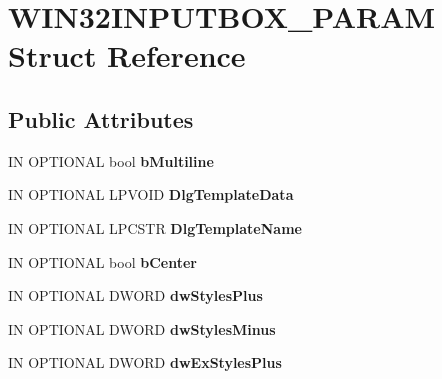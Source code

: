 \hypertarget{structWIN32INPUTBOX__PARAM}{}\section{W\+I\+N32\+I\+N\+P\+U\+T\+B\+O\+X\+\_\+\+P\+A\+R\+AM Struct Reference}
\label{structWIN32INPUTBOX__PARAM}
\subsection*{Public Attributes}
\begin{DoxyCompactItemize}
\item 
\mbox{\label{structWIN32INPUTBOX__PARAM_abeb072c1c3747635c1ee330251405233}} 
IN O\+P\+T\+I\+O\+N\+AL bool {\bfseries b\+Multiline}
\item 
\mbox{\label{structWIN32INPUTBOX__PARAM_a74f1f42fccf46874a93fdf6016dacf90}} 
IN O\+P\+T\+I\+O\+N\+AL L\+P\+V\+O\+ID {\bfseries Dlg\+Template\+Data}
\item 
\mbox{\label{structWIN32INPUTBOX__PARAM_a3af9465883dac58e0727bb8281d108b5}} 
IN O\+P\+T\+I\+O\+N\+AL L\+P\+C\+S\+TR {\bfseries Dlg\+Template\+Name}
\item 
\mbox{\label{structWIN32INPUTBOX__PARAM_a0ebbe7ef3e2720d4d73c31a2fb7a3020}} 
IN O\+P\+T\+I\+O\+N\+AL bool {\bfseries b\+Center}
\item 
\mbox{\label{structWIN32INPUTBOX__PARAM_a3c4c1d2624b5885d84a4e40340792847}} 
IN O\+P\+T\+I\+O\+N\+AL D\+W\+O\+RD {\bfseries dw\+Styles\+Plus}
\item 
\mbox{\label{structWIN32INPUTBOX__PARAM_a26637e996007339d8bb996540d329d00}} 
IN O\+P\+T\+I\+O\+N\+AL D\+W\+O\+RD {\bfseries dw\+Styles\+Minus}
\item 
\mbox{\label{structWIN32INPUTBOX__PARAM_a452f4ce47a025893779428266aa89a44}} 
IN O\+P\+T\+I\+O\+N\+AL D\+W\+O\+RD {\bfseries dw\+Ex\+Styles\+Plus}
\item 
\mbox{\label{structWIN32INPUTBOX__PARAM_a9777eb4086fcc8b4abf4a70b8240fb1f}} 

\end{DoxyCompactItemize}
